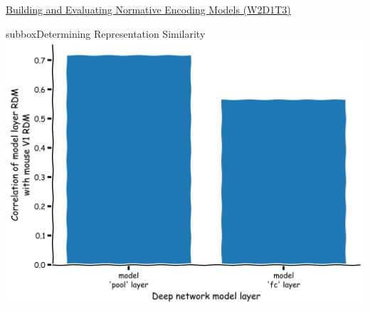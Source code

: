 \begin{textbox}{\href{https://compneuro.neuromatch.io/tutorials/W2D1_DeepLearning/student/W2D1_Tutorial3.html}{Building and Evaluating Normative Encoding Models (W2D1T3)} }
\begin{subbox}{subbox}{Determining Representation Similarity}
\centering
\includegraphics[scale=0.12]{Figures/DL/DLFigure5.png}

\end{subbox}
\end{textbox}

